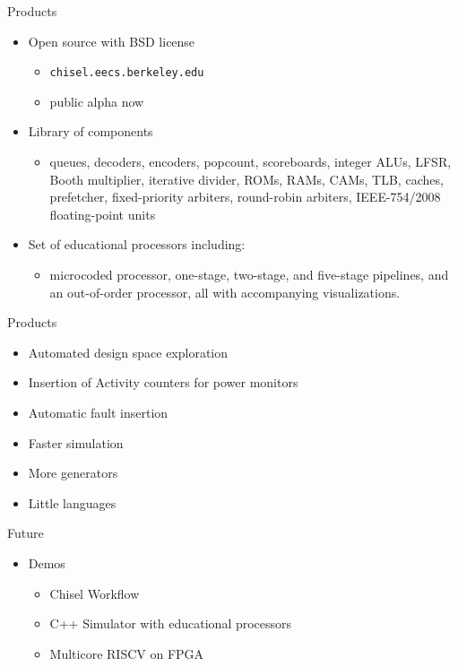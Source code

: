 \documentclass[xcolor=pdflatex,dvipsnames,table]{beamer}
\begin{document}
\begin{frame}[fragile]{Products}

\begin{itemize}
\item Open source with BSD license
\begin{itemize}
\item \verb+chisel.eecs.berkeley.edu+
\item public alpha now
\end{itemize}
\item Library of components
\begin{itemize}
\item queues, decoders, encoders, popcount, scoreboards, integer ALUs, LFSR, Booth multiplier, iterative divider, ROMs, RAMs, CAMs, TLB, caches, prefetcher, fixed-priority arbiters, round-robin arbiters, IEEE-754/2008 floating-point units
\end{itemize}
\item Set of educational processors including:
\begin{itemize}
\item microcoded processor, one-stage, two-stage, and five-stage pipelines, and an out-of-order processor, all with accompanying visualizations.
\end{itemize}
\end{itemize}

\end{frame}

\begin{frame}[fragile]{Products}

\begin{itemize}
\item Automated design space exploration
\item Insertion of Activity counters for power monitors
\item Automatic fault insertion
\item Faster simulation
\item More generators
\item Little languages
\end{itemize}

\end{frame}

\begin{frame}[fragile]{Future}

\begin{itemize}
\item Demos
\begin{itemize}
\item Chisel Workflow
\item C++ Simulator with educational processors
\item Multicore RISCV on FPGA
\end{itemize}
\end{itemize}

\end{frame}
\end{document}
